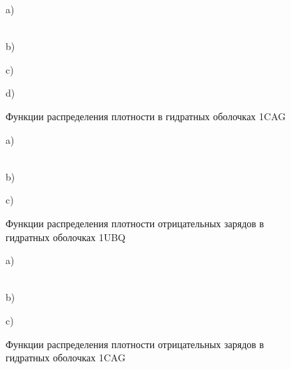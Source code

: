 \documentclass[a4paper]{article}
\begin{document}
\begin{figure}[H]
\begin{minipage}[h]{0.47\linewidth}
 a) \\
\end{minipage}
\hfill
\begin{minipage}[h]{0.47\linewidth}
 \\b)
\end{minipage}
\vfill
\begin{minipage}[h]{0.47\linewidth}
 c) \\
\end{minipage}
\hfill
\begin{minipage}[h]{0.47\linewidth}
 d) \\
\end{minipage}
\caption{ Функции распределения плотности в гидратных оболочках 1CAG}
\label{ris: ubq_density}
\end{figure}


\begin{figure}[H]
\begin{minipage}[h]{0.47\linewidth}
 a) \\
\end{minipage}
\hfill
\begin{minipage}[h]{0.47\linewidth}
 \\b)
\end{minipage}
\vfill
\begin{minipage}[h]{0.47\linewidth}
 c) \\
\end{minipage}
\caption{ Функции распределения плотности отрицательных зарядов в гидратных оболочках 1UBQ}
\label{ris: ubq_density}
\end{figure}


\begin{figure}[H]
\begin{minipage}[h]{0.47\linewidth}
 a) \\
\end{minipage}
\hfill
\begin{minipage}[h]{0.47\linewidth}
 \\b)
\end{minipage}
\vfill
\begin{minipage}[h]{0.47\linewidth}
 c) \\
\end{minipage}

\caption{ Функции распределения плотности отрицательных зарядов в гидратных оболочках 1CAG}

\label{ris: ubq_density}
\end{figure}
\end{document}
